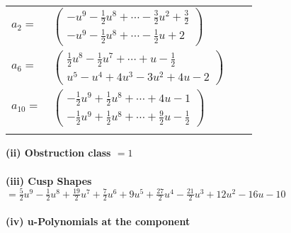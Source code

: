 \documentclass[1p]{elsarticle_modified}
\theoremstyle{definition}
\begin{document}
\begin{tabular}{m{7pt} m{180pt} m{7pt} m{180pt} }
\flushright $a_{2}=$&$\begin{pmatrix}- u^9-\frac{1}{2} u^8+\cdots-\frac{3}{2} u^2+\frac{3}{2}\\- u^9-\frac{1}{2} u^8+\cdots-\frac{1}{2} u+2\end{pmatrix}$ \\
\flushright $a_{6}=$&$\begin{pmatrix}\frac{1}{2} u^8-\frac{1}{2} u^7+\cdots+u-\frac{1}{2}\\u^5- u^4+4 u^3-3 u^2+4 u-2\end{pmatrix}$ \\
\flushright $a_{10}=$&$\begin{pmatrix}-\frac{1}{2} u^9+\frac{1}{2} u^8+\cdots+4 u-1\\-\frac{1}{2} u^9+\frac{1}{2} u^8+\cdots+\frac{9}{2} u-\frac{1}{2}\end{pmatrix}$\\&\end{tabular}
\flushleft \textbf{(ii) Obstruction class $= 1$}\\~\\
\flushleft \textbf{(iii) Cusp Shapes $= \frac{5}{2} u^9-\frac{1}{2} u^8+\frac{19}{2} u^7+\frac{7}{2} u^6+9 u^5+\frac{27}{2} u^4-\frac{21}{2} u^3+12 u^2-16 u-10$}\\~\\
\newpage\renewcommand{\arraystretch}{1}
\flushleft \textbf{(iv) u-Polynomials at the component}\newline \\
\end{document}

